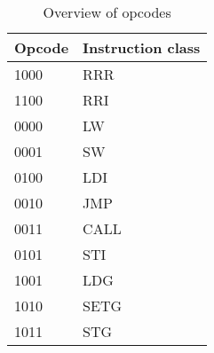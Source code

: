 \begin{table}
    \centering
    \begin{tabular}{| l | l |}
    \hline
    Opcode & Instruction class \\
    \hline
    1000   & RRR               \\
    1100   & RRI               \\
    0000   & LW                \\
    0001   & SW                \\
    0100   & LDI               \\
    0010   & JMP               \\
    0011   & CALL              \\
    0101   & STI               \\
    1001   & LDG               \\
    1010   & SETG              \\
    1011   & STG               \\
    \hline       
    
    \end{tabular}
    \caption{Overview of opcodes}
    \label{fpga:tbl:opcode_tbl}

\end{table}
